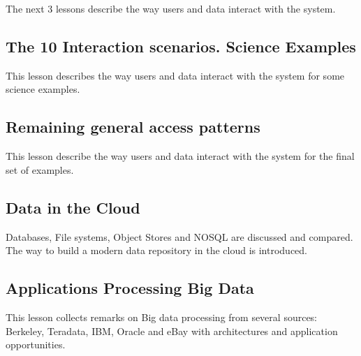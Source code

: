 The next 3 lessons describe the way users and data interact with the
system.


\subsection{The 10 Interaction scenarios. Science Examples}

This lesson describes the way users and data interact with the system
for some science examples.


\subsection{Remaining general access patterns}

This lesson describe the way users and data interact with the system for
the final set of examples.



\subsection{Data in the Cloud}\label{data-in-the-cloud}

Databases, File systems, Object Stores and NOSQL are discussed and
compared. The way to build a modern data repository in the cloud is
introduced.


\subsection{Applications Processing Big Data}

This lesson collects remarks on Big data processing from several
sources: Berkeley, Teradata, IBM, Oracle and eBay with architectures and
application opportunities.


